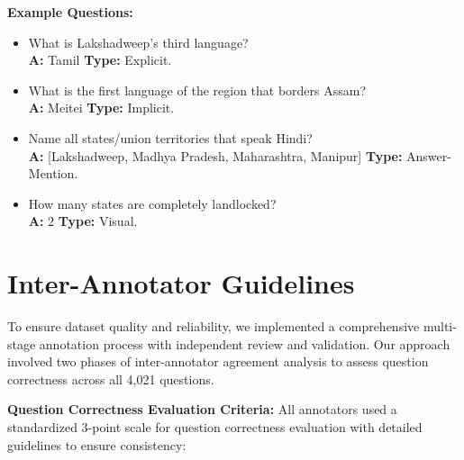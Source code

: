\documentclass[11pt]{article}
\begin{document}
\noindent\textbf{Example Questions:}
\begin{itemize}[leftmargin=*,itemsep=0.1em,topsep=0.1em]
    \item[\textbf{Q:}] What is Lakshadweep's third language? \\
    \textbf{A:} Tamil \quad \textbf{Type:} Explicit.
    \vspace{-0.5em}
    \item[\textbf{Q:}] What is the first language of the region that borders Assam? \\
    \textbf{A:} Meitei \quad \textbf{Type:} Implicit.
    \vspace{-0.5em}
    \item[\textbf{Q:}] Name all states/union territories that speak Hindi? \\
    \textbf{A:} [Lakshadweep, Madhya Pradesh, Maharashtra, Manipur] \quad \textbf{Type:} Answer-Mention.
    \vspace{-0.5em}
    \item[\textbf{Q:}] How many states are completely landlocked? \\
    \textbf{A:} $2$ \quad \textbf{Type:} Visual.
\end{itemize}
\section{Inter-Annotator Guidelines}\label{sec:IAA}

To ensure dataset quality and reliability, we implemented a comprehensive multi-stage annotation process with independent review and validation. Our approach involved two phases of inter-annotator agreement analysis to assess question correctness across all 4,021 questions.

\textbf{Question Correctness Evaluation Criteria:} All annotators used a standardized 3-point scale for question correctness evaluation with detailed guidelines to ensure consistency:
\end{document}
